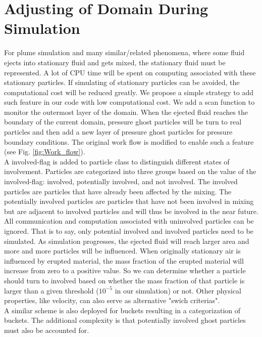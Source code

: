 \documentclass[procedia]{easychair}
\begin{document}
\section{Adjusting of Domain During Simulation} 
For plume simulation and many similar/related phenomena, where some fluid ejects into stationary fluid and gets mixed, the stationary fluid must be represented.
A lot of CPU time will be spent on computing associated with these stationary particles. If simulating of stationary particles can be avoided, the computational cost will be reduced greatly.
We propose a simple strategy to add such feature in our code with low computational cost. We add a scan function to monitor the outermost layer of the domain. When the ejected fluid reaches the boundary of the current domain, pressure ghost particles will be turn to real particles and then add a new layer of pressure ghost particles for pressure boundary conditions. The original work flow is modified to enable such a feature (see Fig. \ref{fig:Work_flow}).\\
A involved-flag is added to particle class to distinguish different states of involvement. Particles are categorized into three groups based on the value of the involved-flag: involved, potentially involved, and not involved. The involved particles are particles that have already been affected by the mixing. The potentially involved particles are particles that have not been involved in mixing but are adjacent to involved particles and will thus be involved in the near future. 
All communication and computation associated with uninvolved particles can be ignored. That is to say, only potential involved and involved particles need to be simulated.
As simulation progresses, the ejected fluid will reach larger area and more and more particles will be influenced. When originally stationary air is influenced by erupted material, the mass fraction of the erupted material will increase from zero to a positive value. So we can determine whether a particle should turn to involved based on whether the mass fraction of that particle is larger than a given threshold ($10^{-5} $ in our simulation) or not. Other physical properties, like velocity, can also serve as alternative "swich criterias".\\
A similar scheme is also deployed for buckets resulting in a categorization of buckets. The additional complexity is that potentially involved ghost particles must also be accounted for.
\end{document}
